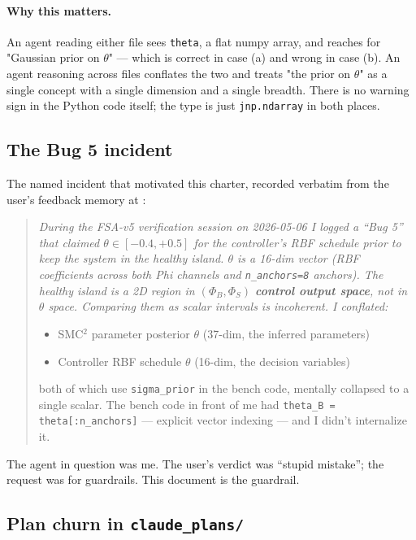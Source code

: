 \documentclass[11pt,a4paper]{article}
\begin{document}
\paragraph{Why this matters.} An agent reading either file sees
\texttt{theta}, a flat numpy array, and reaches for "Gaussian prior
on $\theta$" --- which is correct in case (a) and wrong in case
(b). An agent reasoning across files conflates the two and treats
"the prior on $\theta$" as a single concept with a single dimension
and a single breadth. There is no warning sign in the Python code
itself; the type is just \texttt{jnp.ndarray} in both places.

\subsection{The Bug 5 incident}
\label{sec:bug5}

The named incident that motivated this charter, recorded verbatim
from the user's feedback memory at
:

\begin{quote}\itshape
During the FSA-v5 verification session on 2026-05-06 I logged a
``Bug 5'' that claimed $\theta \in [-0.4, +0.5]$ for the controller's
RBF schedule prior to keep the system in the healthy island.
$\theta$ is a 16-dim vector (RBF coefficients across both Phi
channels and \texttt{n\_anchors=8} anchors). The healthy island is a
2D region in $(\Phi_B, \Phi_S)$ \textbf{control output space}, not in
$\theta$ space. Comparing them as scalar intervals is incoherent. I
conflated:
\begin{itemize}
\item SMC$^2$ parameter posterior $\theta$ (37-dim, the inferred
  parameters)
\item Controller RBF schedule $\theta$ (16-dim, the decision
  variables)
\end{itemize}
both of which use \texttt{sigma\_prior} in the bench code, mentally
collapsed to a single scalar. The bench code in front of me had
\texttt{theta\_B = theta[:n\_anchors]} --- explicit vector indexing
--- and I didn't internalize it.
\end{quote}

The agent in question was me. The user's verdict was ``stupid
mistake''; the request was for guardrails. This document is the
guardrail.

\subsection{Plan churn in \texttt{claude\_plans/}}
\label{sec:plan-churn}
\end{document}
